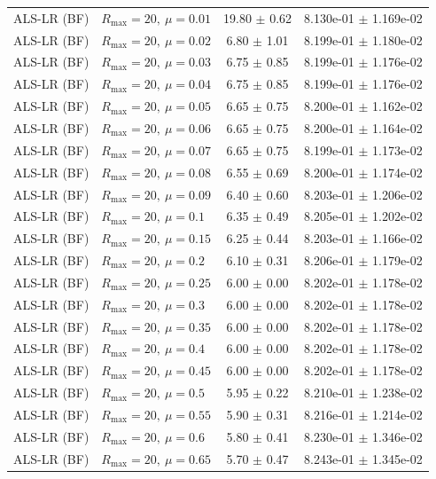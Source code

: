 \begin{table}[t]
\begin{tabular}{@{}llcc@{}}
ALS-LR (BF) & \(R_{\max}=20,\ \mu=0.01\) & 19.80 $\pm$ 0.62 & 8.130e-01 $\pm$ 1.169e-02 \\
ALS-LR (BF) & \(R_{\max}=20,\ \mu=0.02\) & 6.80 $\pm$ 1.01 & 8.199e-01 $\pm$ 1.180e-02 \\
ALS-LR (BF) & \(R_{\max}=20,\ \mu=0.03\) & 6.75 $\pm$ 0.85 & 8.199e-01 $\pm$ 1.176e-02 \\
ALS-LR (BF) & \(R_{\max}=20,\ \mu=0.04\) & 6.75 $\pm$ 0.85 & 8.199e-01 $\pm$ 1.176e-02 \\
ALS-LR (BF) & \(R_{\max}=20,\ \mu=0.05\) & 6.65 $\pm$ 0.75 & 8.200e-01 $\pm$ 1.162e-02 \\
ALS-LR (BF) & \(R_{\max}=20,\ \mu=0.06\) & 6.65 $\pm$ 0.75 & 8.200e-01 $\pm$ 1.164e-02 \\
ALS-LR (BF) & \(R_{\max}=20,\ \mu=0.07\) & 6.65 $\pm$ 0.75 & 8.199e-01 $\pm$ 1.173e-02 \\
ALS-LR (BF) & \(R_{\max}=20,\ \mu=0.08\) & 6.55 $\pm$ 0.69 & 8.200e-01 $\pm$ 1.174e-02 \\
ALS-LR (BF) & \(R_{\max}=20,\ \mu=0.09\) & 6.40 $\pm$ 0.60 & 8.203e-01 $\pm$ 1.206e-02 \\
ALS-LR (BF) & \(R_{\max}=20,\ \mu=0.1\) & 6.35 $\pm$ 0.49 & 8.205e-01 $\pm$ 1.202e-02 \\
ALS-LR (BF) & \(R_{\max}=20,\ \mu=0.15\) & 6.25 $\pm$ 0.44 & 8.203e-01 $\pm$ 1.166e-02 \\
ALS-LR (BF) & \(R_{\max}=20,\ \mu=0.2\) & 6.10 $\pm$ 0.31 & 8.206e-01 $\pm$ 1.179e-02 \\
ALS-LR (BF) & \(R_{\max}=20,\ \mu=0.25\) & 6.00 $\pm$ 0.00 & 8.202e-01 $\pm$ 1.178e-02 \\
ALS-LR (BF) & \(R_{\max}=20,\ \mu=0.3\) & 6.00 $\pm$ 0.00 & 8.202e-01 $\pm$ 1.178e-02 \\
ALS-LR (BF) & \(R_{\max}=20,\ \mu=0.35\) & 6.00 $\pm$ 0.00 & 8.202e-01 $\pm$ 1.178e-02 \\
ALS-LR (BF) & \(R_{\max}=20,\ \mu=0.4\) & 6.00 $\pm$ 0.00 & 8.202e-01 $\pm$ 1.178e-02 \\
ALS-LR (BF) & \(R_{\max}=20,\ \mu=0.45\) & 6.00 $\pm$ 0.00 & 8.202e-01 $\pm$ 1.178e-02 \\
ALS-LR (BF) & \(R_{\max}=20,\ \mu=0.5\) & 5.95 $\pm$ 0.22 & 8.210e-01 $\pm$ 1.238e-02 \\
ALS-LR (BF) & \(R_{\max}=20,\ \mu=0.55\) & 5.90 $\pm$ 0.31 & 8.216e-01 $\pm$ 1.214e-02 \\
ALS-LR (BF) & \(R_{\max}=20,\ \mu=0.6\) & 5.80 $\pm$ 0.41 & 8.230e-01 $\pm$ 1.346e-02 \\
ALS-LR (BF) & \(R_{\max}=20,\ \mu=0.65\) & 5.70 $\pm$ 0.47 & 8.243e-01 $\pm$ 1.345e-02 \\

\end{tabular}
\end{table}
